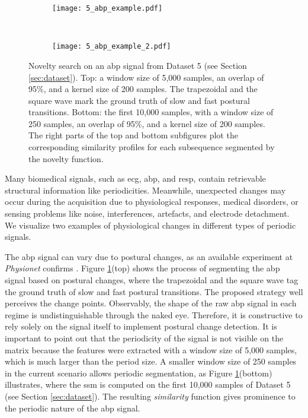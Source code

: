 \begin{figure}
    \centering
    \begin{subfigure}[b]{\textwidth}
         \centering
         \texttt{[image: 5\_abp\_example.pdf]}
    \end{subfigure}\\
    \vspace{5mm}
    \begin{subfigure}[b]{\textwidth}
         \centering
         \texttt{[image: 5\_abp\_example\_2.pdf]}
    \end{subfigure}
    \caption{Novelty search on an \gls{abp} signal from Dataset 5 (see Section \ref{sec:dataset}). Top: a window size of 5,000 samples, an overlap of 95\%, and a kernel size of 200 samples. The trapezoidal and the square wave mark the ground truth of slow and fast postural transitions. Bottom: the first 10,000 samples, with a window size of 250 samples, an overlap of 95\%, and a kernel size of 200 samples. The right parts of the top and bottom subfigures plot the corresponding similarity profiles for each subsequence segmented by the novelty function.}
    \label{fig:use_case2}
\end{figure}

Many biomedical signals, such as \gls{ecg}, \gls{abp}, and \gls{resp}, contain retrievable structural information like periodicities. Meanwhile, unexpected changes may occur during the acquisition due to physiological responses, medical disorders, or sensing problems like noise, interferences, artefacts, and electrode detachment. We visualize two examples of physiological changes in different types of periodic signals.

The \gls{abp} signal can vary due to postural changes, as an available experiment at \textit{Physionet} confirms \cite{tilt, PhBank}. Figure \ref{fig:use_case2}(top) shows the process of segmenting the \gls{abp} signal based on postural changes, where the trapezoidal and the square wave tag the ground truth of slow and fast postural transitions. The proposed strategy well perceives the change points. Observably, the shape of the raw \gls{abp} signal in each regime is undistinguishable through the naked eye. Therefore, it is constructive to rely solely on the signal itself to implement postural change detection. It is important to point out that the periodicity of the signal is not visible on the matrix because the features were extracted with a window size of 5,000 samples, which is much larger than the period size. A smaller window size of 250 samples in the current scenario allows periodic segmentation, as Figure \ref{fig:use_case2}(bottom) illustrates, where the \gls{ssm} is computed on the first 10,000 samples of Dataset 5 (see Section \ref{sec:dataset}).
The resulting \textit{similarity} function gives prominence to the periodic nature of the \gls{abp} signal.

